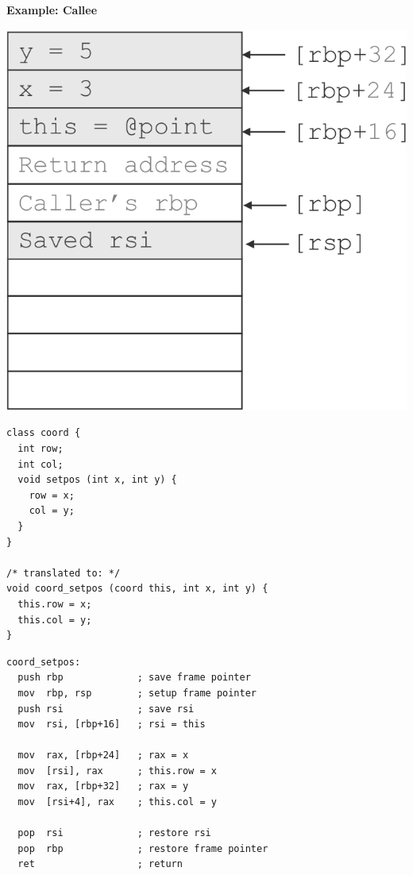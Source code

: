 \documentclass[twocolumn,english]{article}
\begin{document}
\begin{table}[H]
\textbf{Example: Callee}

\noindent \begin{centering}
\includegraphics[scale=0.15]{img/stack}
\par\end{centering}

\noindent \begin{minipage}[t]{0.2\textwidth}
\begin{lstlisting}[basicstyle={\scriptsize\ttfamily},breaklines=true,keywords={loop, exit, when, end}]
class coord {
  int row;
  int col;
  void setpos (int x, int y) {
    row = x;
    col = y;
  }
}

/* translated to: */
void coord_setpos (coord this, int x, int y) {
  this.row = x;
  this.col = y;
}
\end{lstlisting}


\noindent \end{minipage}
\begin{minipage}[t]{0.3\textwidth}

\noindent \begin{centering}
\begin{lstlisting}[basicstyle={\scriptsize\ttfamily},breaklines=true,keywords={loop, exit, when, end}]
coord_setpos:
  push rbp             ; save frame pointer
  mov  rbp, rsp        ; setup frame pointer
  push rsi             ; save rsi
  mov  rsi, [rbp+16]   ; rsi = this
  
  mov  rax, [rbp+24]   ; rax = x
  mov  [rsi], rax      ; this.row = x
  mov  rax, [rbp+32]   ; rax = y
  mov  [rsi+4], rax    ; this.col = y

  pop  rsi             ; restore rsi
  pop  rbp             ; restore frame pointer
  ret                  ; return
\end{lstlisting}

\par\end{centering}

\noindent \centering{}\end{minipage}
\end{table}
\end{document}
